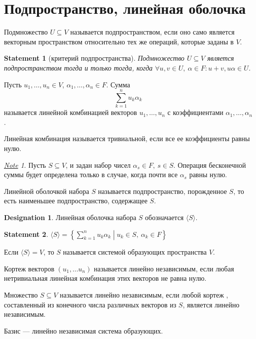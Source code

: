\documentclass[11pt]{book}
\newcommand{\slim}{\sum\limits}
\theoremstyle{definition}
\theoremstyle{plain}
\theoremstyle{plain}
\newtheorem{st}{Statement}
\theoremstyle{definition}
\newtheorem*{name}{Designation}
\theoremstyle{remark}
\newtheorem*{note}{\underline{Note}}
\begin{document}
\section{Подпространство, линейная оболочка}
\begin{defn}
    Подмножество  $ U \subseteq V$ называется {\sf подпространством}, если оно само является векторным пространством относительно тех же операций, которые заданы в $ V$.
\end{defn}
\begin{st}[критерий подпространства]
    Подмножество $ U \subseteq V$ является подпространством тогда и только тогда, когда $ \forall u, v \in U, ~ \alpha \in F: u + v, u \alpha \in U$.
\end{st}
\begin{defn}
    Пусть  $ u_1, \ldots , u_n \in V$, $ \alpha_1, \ldots , \alpha_n \in F$. Сумма
    \[
	\sum _{k = 1}^{n} u_k \alpha_k
    \]
    называется {\sf линейной комбинацией} векторов $ u_1, \ldots , u_n$ с коэффициентами $ \alpha_1, \ldots , \alpha _n$.

    Линейная комбинация называется {\sf тривиальной}, если все ее коэффициенты равны нулю.
\end{defn}
\begin{note}
    Пусть $ S \subseteq V$, и задан набор чисел $ \alpha_s \in F, ~s \in S$. Операция бесконечной суммы будет определена только в случае, когда почти все $ \alpha _s$ равны нулю.
\end{note}
\begin{defn}
    {\sf Линейной оболочкой}  набора $ S$ называется подпространство, порожденное   $ S$, то есть наименьшее подпространство, содержащее  $ S$.
    \begin{name}
	Линейная оболочка  набора $ S$ обозначается   $ \langle S \rangle$.
    \end{name}
\end{defn}
\begin{st}
    $ \langle S \rangle = \left\{ \slim_{k=1}^{n} u_k \alpha_k \middle| u_k\in S, ~ \alpha_k \in F \right\} $
\end{st}
\begin{defn}
    Если $ \langle S \rangle = V$, то $ S$ называется {\sf системой образующих} пространства  $ V$.
\end{defn}
\begin{defn}
    Кортеж векторов $ (u_1, \ldots u_n)$ называется {\sf линейно независимым}, если любая нетривиальная линейная комбинация этих векторов не равна нулю.

    Множество $ S \subseteq V$  называется {\sf линейно независимым}, если любой кортеж  , составленный из конечного числа различных векторов из $ S$, является линейно независимым.
\end{defn}
\begin{defn}
    {\sf Базис} --- линейно независимая система образующих.
\end{defn}
\end{document}
